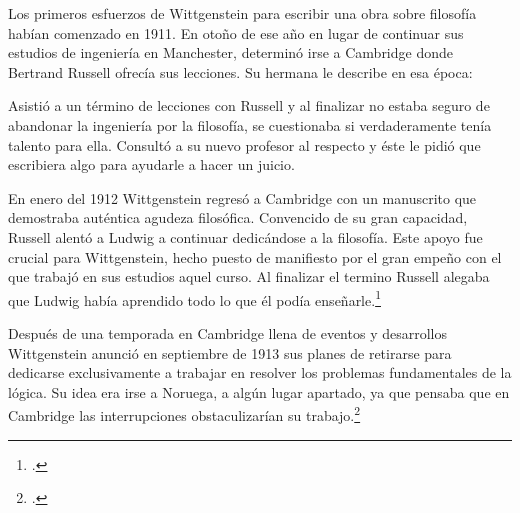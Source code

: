 Los primeros esfuerzos de Wittgenstein para escribir una obra sobre filosofía
habían comenzado en 1911. En otoño de ese año en lugar de continuar sus estudios
de ingeniería en Manchester, determinó irse a Cambridge donde Bertrand Russell
ofrecía sus lecciones. Su hermana le describe en esa época:   

Asistió a un término de lecciones con Russell y al finalizar no estaba seguro de
abandonar la ingeniería por la filosofía, se cuestionaba si verdaderamente tenía
talento para ella. Consultó a su nuevo profesor al respecto y éste le pidió que
escribiera algo para ayudarle a hacer un juicio. 

En enero del 1912 Wittgenstein regresó a Cambridge con un manuscrito que
demostraba auténtica agudeza filosófica. Convencido de su gran capacidad,
Russell alentó a Ludwig a continuar dedicándose a la filosofía. Este
apoyo fue crucial para Wittgenstein, hecho puesto de manifiesto por el gran
empeño con el que trabajó en sus estudios aquel curso. Al finalizar el termino
Russell alegaba que Ludwig había aprendido todo lo que él podía
enseñarle.\footcite[cap. 3 loc 865]{monk} 

Después de una temporada en Cambridge llena de eventos y desarrollos
Wittgenstein anunció en septiembre de 1913 sus planes de retirarse para
dedicarse exclusivamente a trabajar en resolver los problemas fundamentales de
la lógica. Su idea era irse a Noruega, a algún lugar apartado, ya que pensaba
que en Cambridge las interrupciones obstaculizarían su trabajo.\footcite[cap. 4
loc 1844]{monk} 

